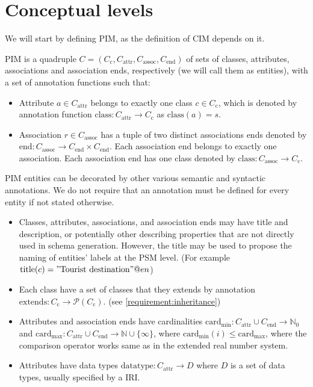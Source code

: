 \section{Conceptual levels}

We will start by defining PIM, as the definition of CIM depends on it.

\begin{definition}[PIM] PIM is a quadruple $C=(C_\textrm{c}, C_\textrm{attr}, C_\textrm{assoc}, C_\textrm{end})$ of sets of classes, attributes, associations and association ends, respectively (we will call them as entities), with a set of annotation functions such that:
    \begin{itemize}
        \item Attribute $a \in C_\textrm{attr}$ belongs to exactly one class $c \in C_\textrm{c}$, which is denoted by annotation function $\textrm{class}: C_\textrm{attr} \rightarrow C_\textrm{c}$ as $\textrm{class}(a)=s$.
        \item Association $r \in C_\textrm{assoc}$ has a tuple of two distinct associations ends denoted by $\textrm{end}: C_\textrm{assoc} \rightarrow C_\textrm{end}\times C_\textrm{end}$. Each association end belongs to exactly one association. Each association end has one class denoted by $\textrm{class}: C_\textrm{assoc} \rightarrow C_\textrm{c}$.
    \end{itemize}

    PIM entities can be decorated by other various semantic and syntactic annotations. We do not require that an annotation must be defined for every entity if not stated otherwise.

    \begin{itemize}
        \item Classes, attributes, associations, and association ends may have title and description, or potentially other describing properties that are not directly used in schema generation. However, the title may be used to propose the naming of entities' labels at the PSM level. (For example $\textrm{title}(c)="\textrm{Tourist destination}"@en$)
        \item Each class have a set of classes that they extends by annotation $\textrm{extends}: C_\textrm{c} \rightarrow \mathcal{P}(C_\textrm{c})$. (see \autoref{requirement:inheritance})
        \item Attributes and association ends have cardinalities $\textrm{card}_{\textrm{min}}: C_\textrm{attr} \cup C_\textrm{end} \rightarrow \mathds{N}_0$ and $\textrm{card}_{\textrm{max}}: C_\textrm{attr} \cup C_\textrm{end} \rightarrow \mathds{N} \cup \{\infty\}$, where $\textrm{card}_{\textrm{min}}(i) \leq \textrm{card}_{\textrm{max}}$, where the comparison operator works same as in the extended real number system.
        \item Attributes have data types $\textrm{datatype}: C_\textrm{attr} \rightarrow D$ where $D$ is a set of data types, usually specified by a IRI.
    \end{itemize}
\end{definition}

